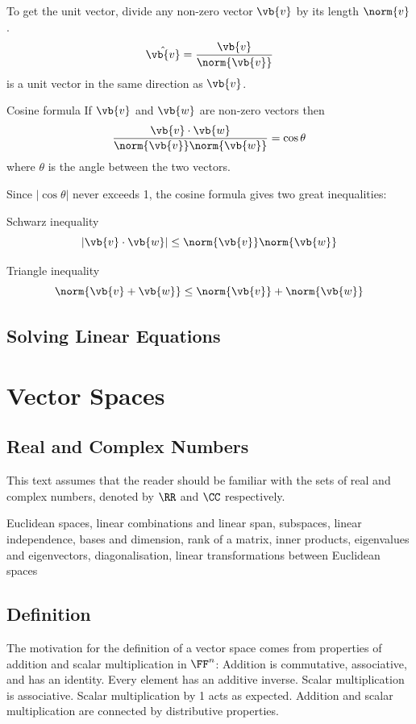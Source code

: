 To get the unit vector, divide any non-zero vector $\vb{v}$ by its length $\norm{v}$.
\begin{equation}
\hat{\vb{v}} = \frac{\vb{v}}{\norm{\vb{v}}}
\end{equation}
is a unit vector in the same direction as $\vb{v}$.

Cosine formula
If $\vb{v}$ and $\vb{w}$ are non-zero vectors then
\begin{equation}
\frac{\vb{v}\cdot\vb{w}}{\norm{\vb{v}}\norm{\vb{w}}} = \cos\theta
\end{equation}
where $\theta$ is the angle between the two vectors.

Since $|\cos\theta|$ never exceeds 1, the cosine formula gives two great inequalities:
\begin{thrm}{Schwarz inequality}{}
\begin{equation}
|\vb{v}\cdot\vb{w}| \le \norm{\vb{v}}\norm{\vb{w}}
\end{equation}
\end{thrm}
\begin{thrm}{Triangle inequality}{}
\begin{equation}
\norm{\vb{v}+\vb{w}} \le \norm{\vb{v}} + \norm{\vb{w}}
\end{equation}
\end{thrm}


\section{Solving Linear Equations}


\chapter{Vector Spaces}
\section{Real and Complex Numbers}
This text assumes that the reader should be familiar with the sets of real and complex numbers, denoted by $\RR$ and $\CC$ respectively.



Euclidean spaces, linear combinations and linear span, subspaces, linear independence, bases and dimension, rank of a matrix, inner products, eigenvalues and eigenvectors, diagonalisation, linear transformations between Euclidean spaces

\section{Definition}
The motivation for the definition of a vector space comes from properties of addition and scalar multiplication in $\FF^n$: Addition is commutative, associative, and has an identity. Every element has an additive inverse. Scalar multiplication is associative. Scalar multiplication by 1 acts as expected. Addition and scalar multiplication are connected by distributive properties. 

